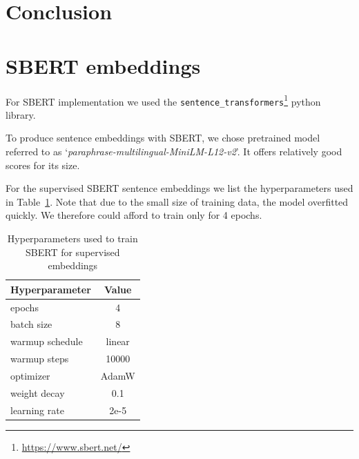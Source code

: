 \documentclass[11pt]{article}
\begin{document}

\section{Conclusion}





\clearpage
\appendix
\section{SBERT embeddings}\label{appendix:sbert_embeddings}

For SBERT implementation we used the
\texttt{sentence\_transformers}\footnote{\url{https://www.sbert.net/}} python
library.

To produce sentence embeddings with SBERT, we chose pretrained model referred
to as `\textit{paraphrase-multilingual-MiniLM-L12-v2}'. It offers relatively
good scores for its size.

For the supervised SBERT sentence embeddings we list the hyperparameters used
in Table~\ref{tab:sbert_supervised_hparams}. Note that due to the small size of
training data, the model overfitted quickly. We therefore could afford to train
only for 4 epochs.

\begin{table}[htp]
  \centering
  \begin{tabular}{l c}
    \toprule
    Hyperparameter & Value\\
    \midrule
    epochs & 4 \\
    batch size & 8 \\
    warmup schedule & linear \\
    warmup steps & 10000 \\
    optimizer & AdamW \\
    weight decay & 0.1 \\
    learning rate & 2e-5 \\
    \bottomrule
  \end{tabular}

  \caption{Hyperparameters used to train SBERT for supervised
  embeddings}\label{tab:sbert_supervised_hparams}

\end{table}
\end{document}
